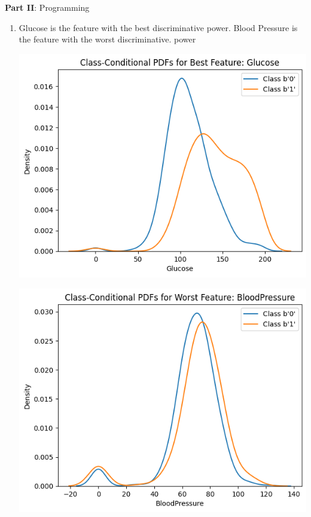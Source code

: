 \documentclass{article}
\begin{document}
\large{\textbf{Part II}: Programming}\normalsize

\begin{enumerate}[leftmargin=\labelsep]
\item Glucose is the feature with the best discriminative power.
Blood Pressure is the feature with the worst discriminative. power
\begin{center}
    \begin{minipage}[t]{0.45\textwidth}
        \centering
        \includegraphics[width=\textwidth]{img/best_disc_feature.png} 
    \end{minipage}
    \hfill
    \begin{minipage}[t]{0.45\textwidth}
        \centering
        \includegraphics[width=\textwidth]{img/worst_dict_feature.png} 
    \end{minipage}
\end{center}



\end{enumerate}
\end{document}
